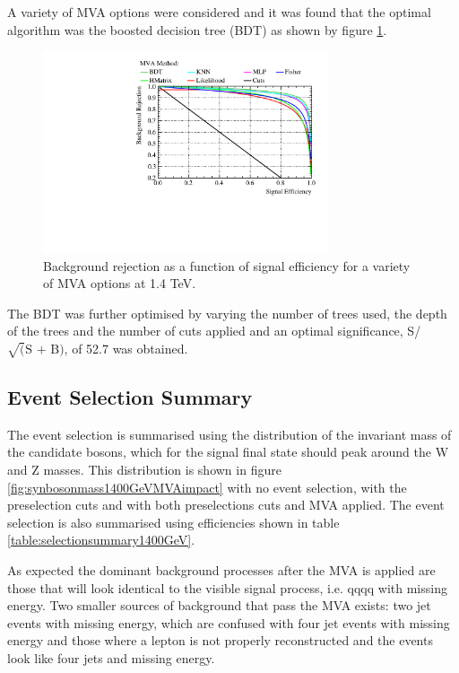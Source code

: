 A variety of MVA options were considered and it was found that the optimal algorithm was the boosted decision tree (BDT) as shown by figure \ref{fig:mvaalternatives1400GeV}.  

\begin{figure}
\centering
\includegraphics[width=0.75\textwidth]{PhysicsAnalysis/Plots/MVAPlots/1400GeV/ThesisPlotMVAAlternatives1400GeV.pdf}
\caption[Background rejection as a function of signal efficiency for a variety of MVA options at 1.4 TeV.]{Background rejection as a function of signal efficiency for a variety of MVA options at 1.4 TeV.} 
\label{fig:mvaalternatives1400GeV}
\end{figure}

The BDT was further optimised by varying the number of trees used, the depth of the trees and the number of cuts applied and an optimal significance, S/$\sqrt(\text{S + B})$, of 52.7 was obtained.  


\subsection{Event Selection Summary}
\label{sec:eventselsummary1400GeV}
The event selection is summarised using the distribution of the invariant mass of the candidate bosons, which for the signal final state should peak around the W and Z masses.  This distribution is shown in figure \ref{fig:synbosonmass1400GeVMVAimpact} with no event selection, with the preselection cuts and with both preselections cuts and MVA applied.  The event selection is also summarised using efficiencies shown in table \ref{table:selectionsummary1400GeV}.

As expected the dominant background processes after the MVA is applied are those that will look identical to the visible signal process, i.e. qqqq with missing energy.  Two smaller sources of background that pass the MVA exists: two jet events with missing energy, which are confused with four jet events with missing energy and those where a lepton is not properly reconstructed and the events look like four jets and missing energy.  

